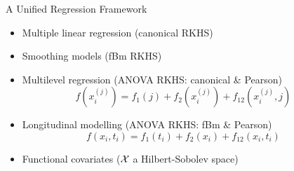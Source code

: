 \documentclass{beamer}
\newlength{\onecolwid}
\newlength{\twocolwid}
\newlength{\threecolwid}
\begin{document}
\begin{frame}[t]
\begin{columns}[t]
\begin{column}{\threecolwid}
\begin{columns}[t,totalwidth=\threecolwid]
\begin{column}{\onecolwid}
\begin{block}{A Unified Regression Framework}
\begin{itemize}
  \item Multiple linear regression (canonical RKHS)
  \item Smoothing models (fBm RKHS)
  \item Multilevel regression (ANOVA RKHS: canonical \& Pearson)
  \vspace{3pt}
  \[
      f(x_i^{(j)}) = f_1(j) + f_2(x_i^{(j)}) + f_{12}(x_i^{(j)}, j)
  \]
  \vspace{-35pt}  
  \item Longitudinal modelling (ANOVA RKHS: fBm \& Pearson)
  \vspace{3pt}
  \[
    f(x_i, t_i) = f_1(t_i) + f_2(x_{i}) + f_{12}(x_{i},t_i)
  \]
  \vspace{-34pt}
  \item Functional covariates (${\mathcal X}$ a Hilbert-Sobolev space)
\end{itemize}

\end{block}

\end{column}  %

\begin{columns}[t,totalwidth=\twocolwid]  %
\begin{column}{\twocolwid}


\end{column}
\end{columns}
\end{columns}
\end{column}
\end{columns}
\end{frame}
\end{document}
